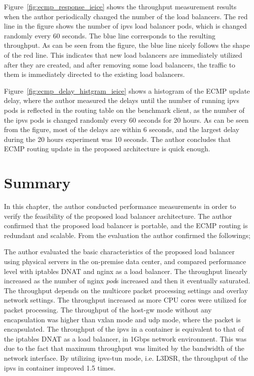 Figure~\ref{fig:ecmp_response_ieice} shows the throughput measurement results when the author periodically changed the number of the load balancers. 
The red line in the figure shows the number of ipvs load balancer pods, which is changed randomly every 60 seconds.
The blue line corresponds to the resulting throughput.
As can be seen from the figure, the blue line nicely follows the shape of the red line.
This indicates that new load balancers are immediately utilized after they are created, and after removing some load balancers, the traffic to them is immediately directed to the existing load balancers.

Figure~\ref{fig:ecmp_delay_histgram_ieice} shows a histogram of the ECMP update delay, where the author measured the delays until the number of running ipvs pods is reflected in the routing table on the benchmark client, as the number of the ipvs pods is changed randomly every 60 seconds for 20 hours.
As can be seen from the figure, most of the delays are within 6 seconds, and the largest delay during the 20 hours experiment was 10 seconds.
The author concludes that ECMP routing update in the proposed architecture is quick enough.

\FloatBarrier

\section{Summary}\label{Conclusions}

In this chapter, the author conducted performance measurements in order to verify the feasibility of the proposed load balancer architecture.
The author confirmed that the proposed load balancer is portable, and the ECMP routing is redundant and scalable.
From the evaluation the author confirmed the followings;

The author evaluated the basic characteristics of the proposed load balancer  using physical servers in the on-premise data center, and compared performance level with iptables DNAT and nginx as a load balancer.
The throughput linearly increased as the number of nginx {\em pod}s increased and then it eventually saturated.
The throughput depends on the multicore packet processing settings and overlay network settings.
The throughput increased as more CPU cores were utilized for packet processing.
The throughput of the host-gw mode without any encapsulation was higher than vxlan mode and udp mode, where the packet is encapsulated.
The throughput of the ipvs in a container is equivalent to that of the iptables DNAT as a load balancer, in 1Gbps network environment.
This was due to the fact that maximum throughput was limited by the bandwidth of the network interface.
By utilizing ipvs-tun mode, i.e. L3DSR, the throughput of the ipvs in container improved 1.5 times.

